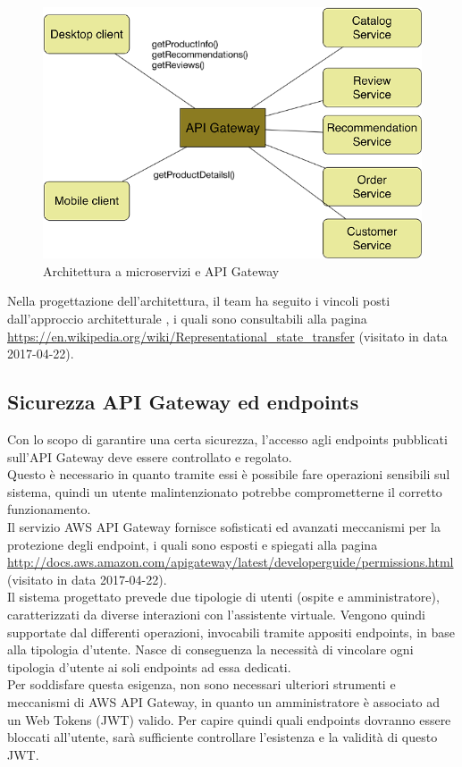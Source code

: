 \begin{figure}[h]
	\centering
	\includegraphics[width=\textwidth,height=\textheight,keepaspectratio,scale=0.1]{images/apigateway1.png}
	\caption{Architettura a microservizi e API Gateway}\label{fig:apig1}
\end{figure}
\newpage
Nella progettazione dell'architettura, il team ha seguito i vincoli posti dall'approccio architetturale , i quali sono consultabili alla pagina \url{https://en.wikipedia.org/wiki/Representational_state_transfer} (visitato in data 2017-04-22).
\subsection{Sicurezza API Gateway ed endpoints}
Con lo scopo di garantire una certa sicurezza, l'accesso agli endpoints pubblicati sull'API Gateway deve essere controllato e regolato. \\Questo è necessario in quanto tramite essi è possibile fare operazioni sensibili sul sistema, quindi un utente malintenzionato potrebbe comprometterne il corretto funzionamento.\\
Il servizio AWS API Gateway fornisce sofisticati ed avanzati meccanismi per la protezione degli endpoint, i quali sono esposti e spiegati alla pagina \url{http://docs.aws.amazon.com/apigateway/latest/developerguide/permissions.html} (visitato in data 2017-04-22). \\

Il sistema progettato prevede due tipologie di utenti (ospite e amministratore), caratterizzati da diverse interazioni con l'assistente virtuale. Vengono quindi supportate dal  differenti operazioni, invocabili tramite appositi endpoints, in base alla tipologia d'utente. Nasce di conseguenza la necessità di vincolare ogni tipologia d'utente ai soli endpoints ad essa dedicati. \\
Per soddisfare questa esigenza, non sono necessari ulteriori strumenti e meccanismi di AWS API Gateway, in quanto un amministratore è associato ad un  Web Tokens (JWT) valido. Per capire quindi quali endpoints dovranno essere bloccati all'utente, sarà sufficiente controllare l'esistenza e la validità di questo JWT.
